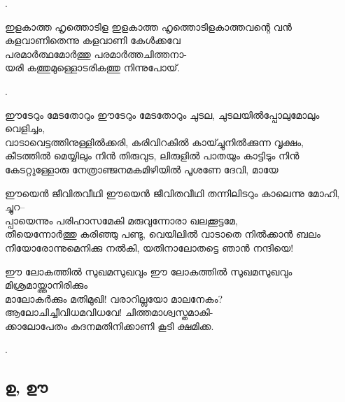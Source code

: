 \begin{enumerate}

. 


\begin{slokam}{\VMb}{\AUK}{ഇളകാത്ത ഹൃത്തൊടിള}
ഇളകാത്ത ഹൃത്തൊടിളകാത്തവന്റെ വൻ \\
കളവാണിതെന്നു കളവാണി കേള്‍ക്കവേ \\
പരമാർത്ഥമോർത്തു പരമാർത്തചിത്തനാ- \\
യരി കത്തുമുള്ളൊടരികത്തു നിന്നുപോയ്‌.
\end{slokam}


.

\begin{slokam}{\VSr}{\RV}{ഈടേറും മേടതോറും}
ഈടേറും മേടതോറും ചുടല, ചുടലയിൽ‌പ്പോലുമോലും വെളിച്ചം,\\
വാടാവെട്ടത്തിനുള്ളിൽക്കരി, കരിവിറകിൽ കായ്ച്ചുനിൽക്കുന്ന വൃക്ഷം,\\
കീടത്തിൽ മെയ്യിലും നിൻ തിരുവുട, ലിരുളിൽ പാതയും കാട്ടിടും നിൻ\\
കേടറ്റുള്ളോരു നേത്രാഞ്ജനമകമിഴിയിൽ‌ പൂശണേ ദേവി, മായേ
\end{slokam}


\begin{slokam}{\VSv}{\UN}{ഈയെൻ ജീവിതവീഥി}
ഈയെൻ ജീവിതവീഥി തന്നിലിടറും കാലെന്നു മോഹി, ച്ചുറ--\\
പ്പായെന്നും പരിഹാസമേകി മരുവുന്നോരാ ഖലക്കൂട്ടമേ,\\
തീയെന്നോർത്തു   കരിഞ്ഞു പണ്ടു,  വെയിലിൽ വാടാതെ നിൽക്കാൻ ബലം\\
നീയോരോന്നുമെനിക്കു നൽകി, യതിനാലോതട്ടെ ഞാൻ നന്ദിയെ!
\end{slokam}



\begin{slokam}{\VMk}{\KV}{ഈ ലോകത്തിൽ സുഖമസുഖവും}
ഈ ലോകത്തിൽ സുഖമസുഖവും മിശ്രമായ്ത്താനിരിക്കും\\
മാലോകർക്കും മതിമുഖി! വരാറില്ലയോ മാലനേകം?\\
ആലോചിച്ചീവിധമവിധവേ! ചിത്തമാശ്വസ്തമാകി-\\
ക്കാലോപേതം കദനമതിനിക്കാണി കൂടി ക്ഷമിക്ക.
\end{slokam}


.

\end{enumerate}

\subsection{ഉ, ഊ}

